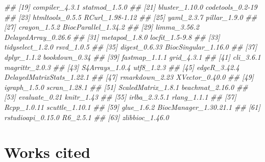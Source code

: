 \documentclass[]{article}
\newcommand{\hlcom}[1]{\textcolor[rgb]{0.502,0.502,0.502}{\textit{#1}}}%
\newenvironment{Shaded}{\begin{myshaded}}{\end{myshaded}}
\newcommand{\DocumentationTok}[1]{\hlcom{#1}}
\begin{document}
\begin{Shaded}
\begin{Highlighting}[]
\DocumentationTok{\#\# [19] compiler\_4.3.1            statmod\_1.5.0            }
\DocumentationTok{\#\# [21] bluster\_1.10.0            codetools\_0.2{-}19         }
\DocumentationTok{\#\# [23] htmltools\_0.5.5           RCurl\_1.98{-}1.12          }
\DocumentationTok{\#\# [25] yaml\_2.3.7                pillar\_1.9.0             }
\DocumentationTok{\#\# [27] crayon\_1.5.2              BiocParallel\_1.34.2      }
\DocumentationTok{\#\# [29] limma\_3.56.2              DelayedArray\_0.26.6      }
\DocumentationTok{\#\# [31] metapod\_1.8.0             locfit\_1.5{-}9.8           }
\DocumentationTok{\#\# [33] tidyselect\_1.2.0          rsvd\_1.0.5               }
\DocumentationTok{\#\# [35] digest\_0.6.33             BiocSingular\_1.16.0      }
\DocumentationTok{\#\# [37] dplyr\_1.1.2               bookdown\_0.34            }
\DocumentationTok{\#\# [39] fastmap\_1.1.1             grid\_4.3.1               }
\DocumentationTok{\#\# [41] cli\_3.6.1                 magrittr\_2.0.3           }
\DocumentationTok{\#\# [43] S4Arrays\_1.0.4            utf8\_1.2.3               }
\DocumentationTok{\#\# [45] edgeR\_3.42.4              DelayedMatrixStats\_1.22.1}
\DocumentationTok{\#\# [47] rmarkdown\_2.23            XVector\_0.40.0           }
\DocumentationTok{\#\# [49] igraph\_1.5.0              scran\_1.28.1             }
\DocumentationTok{\#\# [51] ScaledMatrix\_1.8.1        beachmat\_2.16.0          }
\DocumentationTok{\#\# [53] evaluate\_0.21             knitr\_1.43               }
\DocumentationTok{\#\# [55] irlba\_2.3.5.1             rlang\_1.1.1              }
\DocumentationTok{\#\# [57] Rcpp\_1.0.11               scuttle\_1.10.1           }
\DocumentationTok{\#\# [59] glue\_1.6.2                BiocManager\_1.30.21.1    }
\DocumentationTok{\#\# [61] rstudioapi\_0.15.0         R6\_2.5.1                 }
\DocumentationTok{\#\# [63] zlibbioc\_1.46.0}
\end{Highlighting}
\end{Shaded}

\hypertarget{works-cited}{%
\section*{Works cited}\label{works-cited}}
\end{document}
